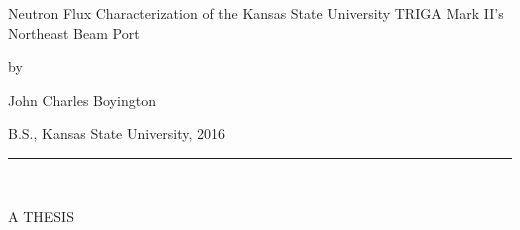 \begin{center}

   \vspace{1cm}


\large Neutron Flux Characterization of the Kansas State University TRIGA Mark II's Northeast Beam Port\\

\vspace{0.5cm}

by\\

\vspace{0.5cm}


\large John Charles Boyington\\

 \vspace{0.3cm}


   B.S., Kansas State University, 2016\\

   \vspace{0.35cm}
   \rule{2in}{0.5pt}\\
   \vspace{0.65cm}

   {\large A THESIS}\\


\end{center}
